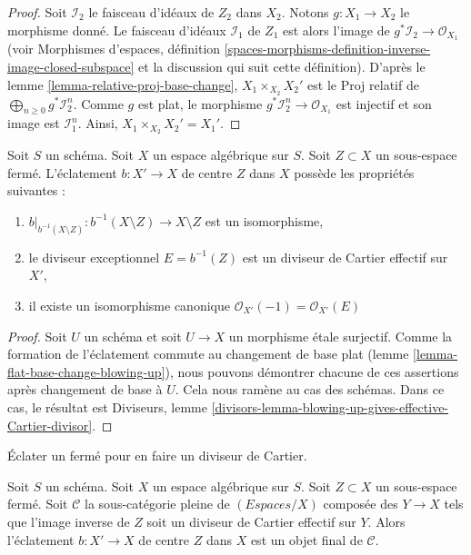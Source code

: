 \begin{proof}
Soit $\mathcal{I}_2$ le faisceau d'idéaux de $Z_2$ dans $X_2$.
Notons $g : X_1 \to X_2$ le morphisme donné. Le faisceau d'idéaux
$\mathcal{I}_1$ de $Z_1$ est alors l'image de
$g^*\mathcal{I}_2 \to \mathcal{O}_{X_1}$
(voir Morphismes d'espaces, définition
\ref{spaces-morphisms-definition-inverse-image-closed-subspace}
et la discussion qui suit cette définition).
D'après le lemme \ref{lemma-relative-proj-base-change},
$X_1 \times_{X_2} X_2'$ est le Proj relatif de
$\bigoplus_{n \geq 0} g^*\mathcal{I}_2^n$. Comme $g$ est plat, le morphisme
$g^*\mathcal{I}_2^n \to \mathcal{O}_{X_1}$ est injectif et son image est
$\mathcal{I}_1^n$. Ainsi, $X_1 \times_{X_2} X_2' = X_1'$.
\end{proof}

\begin{lemma}
\label{lemma-blowing-up-gives-effective-Cartier-divisor}
Soit $S$ un schéma. Soit $X$ un espace algébrique sur $S$.
Soit $Z \subset X$ un sous-espace fermé.
L'éclatement $b : X' \to X$ de centre $Z$ dans $X$
possède les propriétés suivantes :
\begin{enumerate}
\item $b|_{b^{-1}(X \setminus Z)} : b^{-1}(X \setminus Z) \to X \setminus Z$
est un isomorphisme,
\item le diviseur exceptionnel $E = b^{-1}(Z)$ est un diviseur de Cartier effectif
sur $X'$,
\item il existe un isomorphisme canonique
$\mathcal{O}_{X'}(-1) = \mathcal{O}_{X'}(E)$
\end{enumerate}
\end{lemma}

\begin{proof}
Soit $U$ un schéma et soit $U \to X$ un morphisme \'etale surjectif.
Comme la formation de l'éclatement commute au changement de base plat
(lemme \ref{lemma-flat-base-change-blowing-up}),
nous pouvons démontrer chacune de ces assertions après changement de base à $U$.
Cela nous ramène au cas des schémas.
Dans ce cas, le résultat est
Diviseurs, lemme
\ref{divisors-lemma-blowing-up-gives-effective-Cartier-divisor}.
\end{proof}

\begin{lemma}
\label{lemma-universal-property-blowing-up}
\begin{slogan}
Éclater un fermé pour en faire un diviseur de Cartier.
\end{slogan}
Soit $S$ un schéma.
Soit $X$ un espace algébrique sur $S$.
Soit $Z \subset X$ un sous-espace fermé.
Soit $\mathcal{C}$ la sous-catégorie pleine de $(\textit{Espaces}/X)$ composée
des $Y \to X$ tels que l'image inverse de $Z$ soit un
diviseur de Cartier effectif sur $Y$. Alors l'éclatement $b : X' \to X$ de centre $Z$ dans $X$
est un objet final de $\mathcal{C}$.
\end{lemma}


